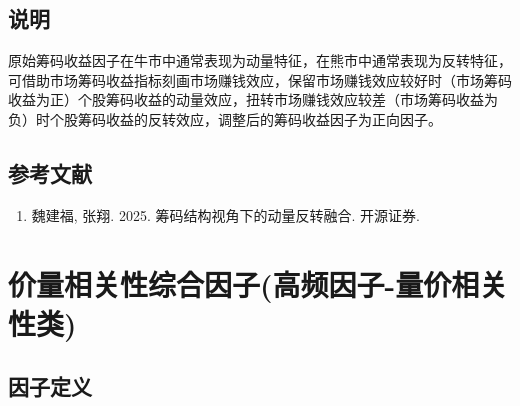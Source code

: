 \documentclass{article}
\begin{document}
\subsection{说明}
原始筹码收益因子在牛市中通常表现为动量特征，在熊市中通常表现为反转特征，可借助市场筹码收益指标刻画市场赚钱效应，保留市场赚钱效应较好时（市场筹码收益为正）个股筹码收益的动量效应，扭转市场赚钱效应较差（市场筹码收益为负）时个股筹码收益的反转效应，调整后的筹码收益因子为正向因子。

\subsection{参考文献}
\begin{enumerate}
    \item 魏建福, 张翔. 2025. 筹码结构视角下的动量反转融合. 开源证券.
\end{enumerate}

\section{价量相关性综合因子(高频因子-量价相关性类)}

\subsection{因子定义}
\end{document}
